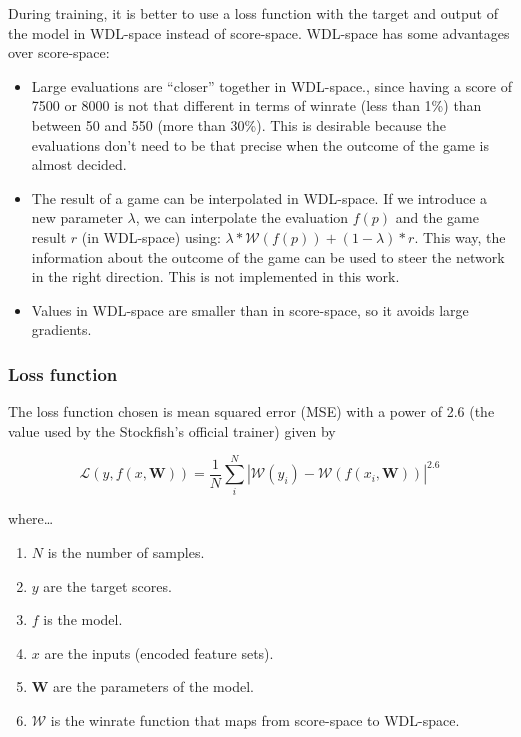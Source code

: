 During training, it is better to use a loss function with the target and output of the model in WDL-space instead of score-space. WDL-space has some advantages over score-space:

\begin{itemize}
\item Large evaluations are \enquote{closer} together in WDL-space., since having a score of 7500 or 8000 is not that different in terms of winrate (less than 1\%) than between 50 and 550 (more than 30\%). This is desirable because the evaluations don't need to be that precise when the outcome of the game is almost decided.
\item The result of a game can be interpolated in WDL-space. If we introduce a new parameter $\lambda$, we can interpolate the evaluation $f(p)$ and the game result $r$ (in WDL-space) using: $\lambda * \mathcal{W}(f(p)) + (1 - \lambda) * r$. This way, the information about the outcome of the game can be used to steer the network in the right direction. This is not implemented in this work.
\item Values in WDL-space are smaller than in score-space, so it avoids large gradients.
\end{itemize}




\subsubsection{Loss function}

The loss function chosen is mean squared error (MSE) with a power of 2.6 (the value used by the Stockfish's official trainer) given by


\[
\mathcal{L}(y,f(x,\bm{W}))= \frac{1}{N} \sum_i^N \left| \mathcal{W}(y_i) - \mathcal{W}(f(x_i,\bm{W})) \right| ^{2.6}
\]

where\dots

\begin{enumerate}
\itemsep0em
\item $N$ is the number of samples.
\item $y$ are the target scores.
\item $f$ is the model.
\item $x$ are the inputs (encoded feature sets).
\item $\bm{W}$ are the parameters of the model.
\item $\mathcal{W}$ is the winrate function that maps from score-space to WDL-space.
\end{enumerate}

